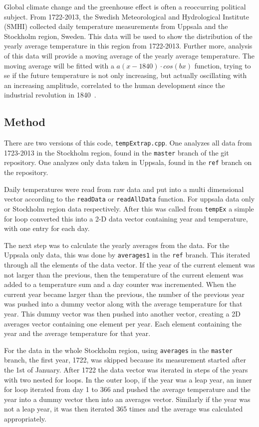 

Global climate change and the greenhouse effect is often a reoccurring political subject. From 1722-2013, the Swedish Meteorological and Hydrological Institute (SMHI) collected daily temperature measurements from Uppsala and the Stockholm region, Sweden. This data will be used to show the distribution of the yearly average temperature in this region from 1722-2013. Further more, analysis of this data will provide a moving average of the yearly average temperature. The moving average will be fitted with a $a(x-1840)\cdot cos(bx)$ function, trying to se if the future temperature is not only increasing, but actually oscillating with an increasing amplitude, correlated to the human development since the industrial revolution in 1840~\cite{industrial}.

\subsection{Method}
There are two versions of this code, \texttt{tempExtrap.cpp}. One analyzes all data from 1723-2013 in the Stockholm region, found in the \texttt{master} branch of the git repository. One analyzes only data taken in Uppsala, found in the \texttt{ref} branch on the repository.

Daily temperatures were read from raw data and put into a multi dimensional vector according to the \texttt{readData} or \texttt{readAllData} function. For uppsala data only or Stockholm region data respectively. After this was called from \texttt{tempEx} a simple for loop converted this into a 2-D data vector containing year and temperature, with one entry for each day.

The next step was to calculate the yearly averages from the data. For the Uppsala only data, this was done by \texttt{averages1} in the \texttt{ref} branch. This iterated through all the elements of the data vector. If the year of the current element was not larger than the previous, then the temperature of the current element was added to a temperature sum and a day counter was incremented. When the current year became larger than the previous, the number of the previous year was pushed into a dummy vector along with the average temperature for that year. This dummy vector was then pushed into another vector, creating a 2D averages vector containing one element per year. Each element containing the year and the average temperature for that year.

For the data in the whole Stockholm region, using \texttt{averages} in the \texttt{master} branch, the first year, 1722, was skipped because its measurement started after the 1st of January. After 1722 the data vector was iterated in steps of the years with two nested for loops. In the outer loop, if the year was a leap year, an inner for loop iterated from day 1 to 366 and pushed the average temperature and the year into a dummy vector then into an averages vector. Similarly if the year was not a leap year, it was then iterated 365 times and the average was calculated appropriately.

